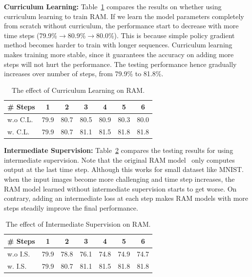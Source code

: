 \documentclass[10pt,twocolumn,letterpaper]{article}
\begin{document}
\textbf{Curriculum Learning:} Table~\ref{tab:curriculum} compares the results on whether using curriculum learning to train RAM.
If we learn the model parameters completely from scratch without curriculum, the performance start to decrease with more time steps (79.9\%$\rightarrow$80.9\%$\rightarrow$80.0\%).
This is because simple policy gradient method becomes harder to train with longer sequences.
Curriculum learning makes training more stable, since it guarantees the accuracy on adding more steps will not hurt the performance.
The testing performance hence gradually increases over number of steps, from 79.9\% to 81.8\%.

\begin{table}
  \centering
  \addtolength{\tabcolsep}{2.5pt}
    \begin{tabular}{l c c c c c c}
      \toprule[0.2 em]
      \# Steps & 1 & 2 & 3 & 4 & 5 & 6 \\
      \toprule[0.2 em]
      w.o C.L. & 79.9 & 80.7 & 80.5 & 80.9 & 80.3 & 80.0 \\
      w. C.L. & 79.9 & 80.7 & 81.1 & 81.5 & 81.8 & 81.8 \\
      \bottomrule[0.1 em]
    \end{tabular}
    \vspace{1pt}
    \caption{The effect of Curriculum Learning on RAM.}
    \label{tab:curriculum}
\end{table}

\textbf{Intermediate Supervision:} Table~\ref{tab:intermediate} compares the testing results for using intermediate supervision.
Note that the original RAM model~\cite{mnih2014recurrent} only computes output at the last time step.
Although this works for small dataset like MNIST.
when the input images become more challenging and time step increases, the RAM model learned without intermediate supervision starts to get worse.
On contrary, adding an intermediate loss at each step makes RAM models with more steps steadily improve the final performance.

\begin{table}
  \centering
  \addtolength{\tabcolsep}{2.5pt}
    \begin{tabular}{l c c c c c c}
      \toprule[0.2 em]
      \# Steps & 1 & 2 & 3 & 4 & 5 & 6 \\
      \toprule[0.2 em]
      w.o I.S. & 79.9 &78.8 & 76.1 & 74.8 & 74.9 & 74.7 \\
      w. I.S. & 79.9 & 80.7 & 81.1 & 81.5 & 81.8 & 81.8 \\
      \bottomrule[0.1 em]
    \end{tabular}
    \vspace{1pt}
    \caption{The effect of Intermediate Supervision on RAM.}
    \label{tab:intermediate}
\end{table}
\end{document}
